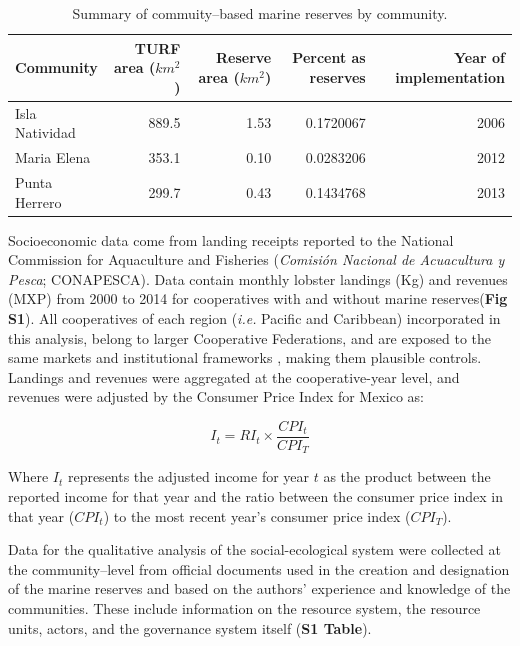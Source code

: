 \documentclass{frontiersSCNS}
\begin{document}
\begin{table}

\caption{\label{tab:unnamed-chunk-2}\label{table:com_sum} Summary of commuity--based marine reserves by community.}
\centering
\begin{tabular}[t]{l|r|r|r|r}
\hline
Community & TURF area ($km^2$) & Reserve area ($km^2$) & Percent as reserves & Year of implementation\\
\hline
Isla Natividad & 889.5 & 1.53 & 0.1720067 & 2006\\
\hline
Maria Elena & 353.1 & 0.10 & 0.0283206 & 2012\\
\hline
Punta Herrero & 299.7 & 0.43 & 0.1434768 & 2013\\
\hline
\end{tabular}
\end{table}

Socioeconomic data come from landing receipts reported to the National
Commission for Aquaculture and Fisheries (\emph{Comisión Nacional de
Acuacultura y Pesca}; CONAPESCA). Data contain monthly lobster landings
(Kg) and revenues (MXP) from 2000 to 2014 for cooperatives with and
without marine reserves(\textbf{Fig S1}). All cooperatives of each
region (\emph{i.e.} Pacific and Caribbean) incorporated in this
analysis, belong to larger Cooperative Federations, and are exposed to
the same markets and institutional frameworks
\citep{mccay_2017-1m,ayer_2018}, making them plausible controls.
Landings and revenues were aggregated at the cooperative-year level, and
revenues were adjusted by the Consumer Price Index for Mexico
\citep{oecd_2017-VV} as:

\begin{equation}
I_t = RI_t\times\frac{CPI_t}{CPI_T}
\label{eqn:cpi}
\end{equation}

Where \(I_t\) represents the adjusted income for year \(t\) as the
product between the reported income for that year and the ratio between
the consumer price index in that year (\(CPI_t\)) to the most recent
year's consumer price index (\(CPI_T\)).

Data for the qualitative analysis of the social-ecological system were
collected at the community--level from official documents used in the
creation and designation of the marine reserves
\citep{dof_website_2012,dof_website_2013,dof_website_2018} and based on
the authors' experience and knowledge of the communities. These include
information on the resource system, the resource units, actors, and the
governance system itself (\textbf{S1 Table}).
\end{document}
